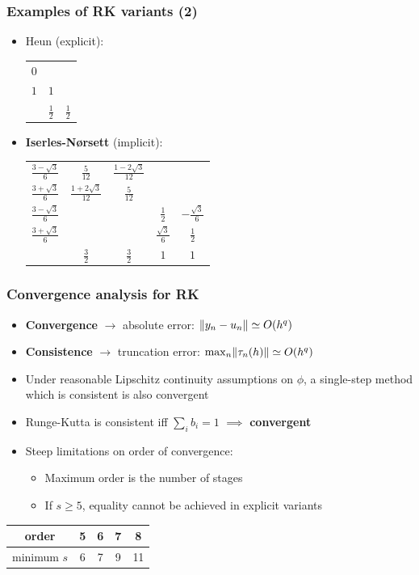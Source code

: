 \documentclass{beamer}
\begin{document}
\begin{frame} %
	\frametitle{Examples of RK variants (2)}
	\begin{itemize}
		\item Heun (explicit):
		\begin{center}
			\begin{tabular}{c|cc}
				$0$ &     & \\
				$1$ & $1$ & \\
				\hline
				& $\frac 1 2$ & $\frac 1 2$
			\end{tabular}
		\end{center}
		\item \textbf{Iserles-Nørsett} (implicit):
		\begin{center}
			\begin{tabular}{c|cccc}
				$\frac{3-\sqrt{3}}{6}$ & $\frac{5}{12}$ & $\frac{1-2\sqrt{3}}{12}$ & & \\
				$\frac{3+\sqrt{3}}{6}$ & $\frac{1+2\sqrt{3}}{12}$ & $\frac{5}{12}$ & & \\
				$\frac{3-\sqrt{3}}{6}$ & & & $\frac{1}{2}$ & $-\frac{\sqrt{3}}{6}$ \\
				$\frac{3+\sqrt{3}}{6}$ & & & $\frac{\sqrt{3}}{6}$ & $\frac{1}{2}$ \\
				\hline
				& $\frac{3}{2}$ & $\frac{3}{2}$ & $1$ & $1$
				\end{tabular} %
		\end{center}
	\end{itemize}
\end{frame}


\begin{frame} %
\frametitle{Convergence analysis for RK}
	\begin{itemize}
		\item \textbf{Convergence} $\to$ absolute error: $\lVert y_n - u_n\rVert \simeq O(h^q)$
		\item \textbf{Consistence} $\to$ truncation error: $\max_n \lVert\tau_n(h)\rVert \simeq O(h^q)$
		\item Under reasonable Lipschitz continuity assumptions on $\phi$, a single-step method which is consistent is also convergent
		\pause
		\item Runge-Kutta is consistent iff $\sum_i b_i = 1$ $\implies$ \textbf{convergent}
		\item Steep limitations on order of convergence:
		\begin{itemize}
			\item Maximum order is the number of stages
			\item If $s \ge 5$, equality cannot be achieved in explicit variants \\[15pt]
		\end{itemize}
	\end{itemize}
	\begin{center}
		\begin{tabular}{c|cccc}
			order & 5 & 6 & 7 & 8\\
			\hline
			minimum $s$ & 6 & 7 & 9 & 11 
		\end{tabular}
	\end{center}
\end{frame}
\end{document}

